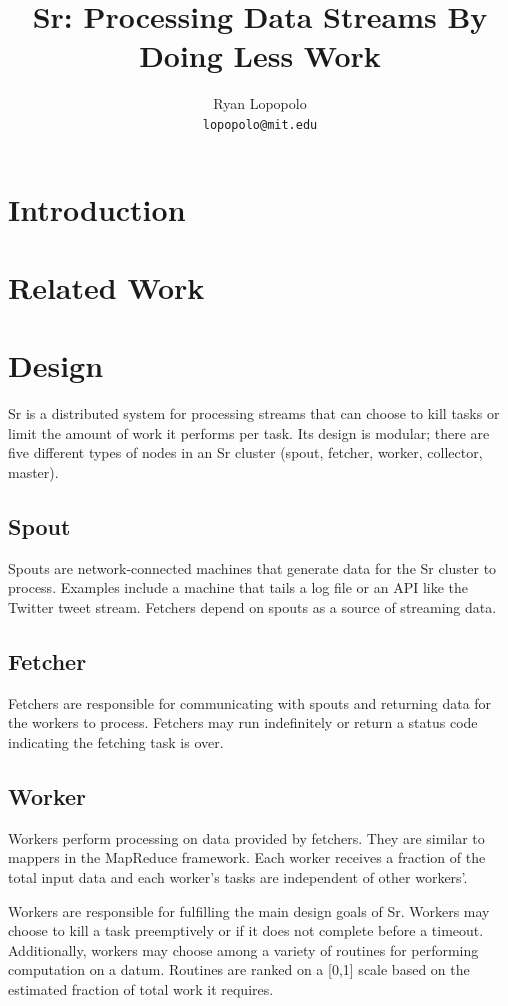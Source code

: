 \documentclass[12pt]{article}
\title{Sr: Processing Data Streams By Doing Less Work}
\author{Ryan Lopopolo\\
\texttt{lopopolo@mit.edu}}
\begin{document}
\twocolumn
\maketitle

\section{Introduction}

\section{Related Work}

\section{Design}
Sr is a distributed system for processing streams that can choose to kill tasks or limit the amount of work it performs per task. Its design is modular; there are five different types of nodes in an Sr cluster (spout, fetcher, worker, collector, master).
\subsection{Spout}
Spouts are network-connected machines that generate data for the Sr cluster to process. Examples include a machine that tails a log file or an API like the Twitter tweet stream. Fetchers depend on spouts as a source of streaming data.
\subsection{Fetcher}
Fetchers are responsible for communicating with spouts and returning data for the workers to process. Fetchers may run indefinitely or return a status code indicating the fetching task is over.
\subsection{Worker}
Workers perform processing on data provided by fetchers. They are similar to mappers in the MapReduce framework. Each worker receives a fraction of the total input data and each worker’s tasks are independent of other workers’.

Workers are responsible for fulfilling the main design goals of Sr. Workers may choose to kill a task preemptively or if it does not complete before a timeout. Additionally, workers may choose among a variety of routines for performing computation on a datum. Routines are ranked on a [0,1] scale based on the estimated fraction of total work it requires.
\end{document}
